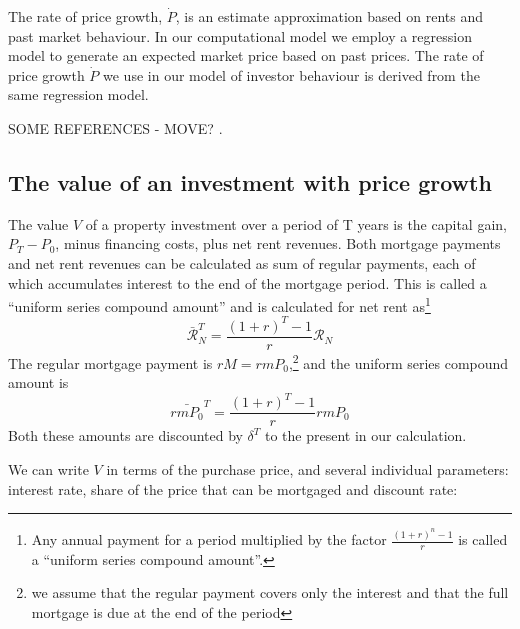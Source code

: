

The rate of price growth, $\dot P$, is an estimate approximation based on rents and past market behaviour. In our computational model we employ a regression model to generate an \gls{expected market price} based on past prices. The rate of price growth $\dot P$ we use in our model of investor behaviour is derived from the same regression model.

SOME REFERENCES - MOVE? \cite{anselinModernSpatialEconometrics2014, gelmanDataAnalysisUsing2006}.

{\color{blue}
 \subsection{The value of an investment with price growth}
The value $V$ of a property investment over a period of T years is  the capital gain, $P_{T}-P_{0}$, minus financing costs, plus net rent revenues. Both mortgage payments and net rent revenues can  be calculated as sum  of regular payments, each of  which accumulates interest to the end of the mortgage period. This is called a ``uniform series compound amount'' and is calculated for net rent as\footnote{Any annual payment for a period multiplied by the factor $\frac{(1+r)^n-1}{r}$ is called a  ``uniform series compound amount''.%
} 
\[\mathcal{\bar{R}}^T_N= \frac{(1+r)^T-1}{r}\mathcal{R}_N  \]
The regular mortgage payment is  $rM=rmP_0$,\footnote{we assume that the regular payment covers only the interest and that the full mortgage is due at the end of the period } and the uniform series compound amount is
\[\bar{rmP_0}^T= \frac{(1+r)^T-1}{r}rmP_0  \]
Both these amounts are discounted by $\delta^T$ to the present in our calculation.
 
 
 We can write $V$ in terms of the purchase price, and several individual parameters: interest  rate, share of the price that can be mortgaged and  discount rate:%
 
}
